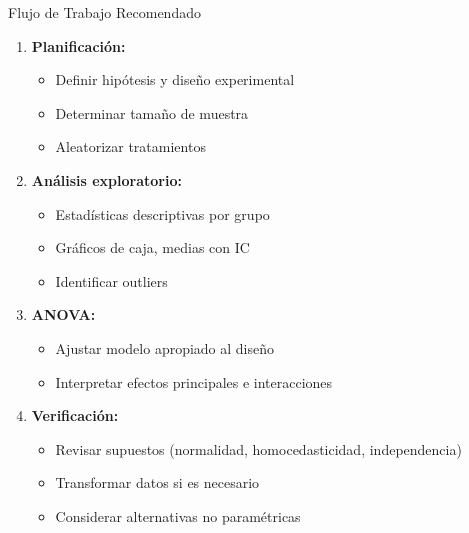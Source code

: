 \documentclass[aspectratio=169]{beamer}
\begin{document}
\begin{frame}{Flujo de Trabajo Recomendado}
\begin{enumerate}
\item \textbf{Planificación:}
\begin{itemize}
\item Definir hipótesis y diseño experimental
\item Determinar tamaño de muestra
\item Aleatorizar tratamientos
\end{itemize}

\vspace{0.2cm}

\item \textbf{Análisis exploratorio:}
\begin{itemize}
\item Estadísticas descriptivas por grupo
\item Gráficos de caja, medias con IC
\item Identificar outliers
\end{itemize}

\vspace{0.2cm}

\item \textbf{ANOVA:}
\begin{itemize}
\item Ajustar modelo apropiado al diseño
\item Interpretar efectos principales e interacciones
\end{itemize}

\vspace{0.2cm}

\item \textbf{Verificación:}
\begin{itemize}
\item Revisar supuestos (normalidad, homocedasticidad, independencia)
\item Transformar datos si es necesario
\item Considerar alternativas no paramétricas
\end{itemize}
\end{enumerate}
\end{frame}
\end{document}
